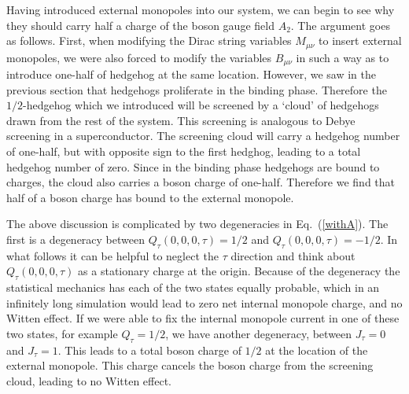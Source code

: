 \documentclass[prb,twocolumn]{revtex4-1}
\begin{document}
Having introduced external monopoles into our system, we can begin to see why they should carry half a charge of the boson gauge field $A_2$. 
The argument goes as follows. First, when modifying the Dirac string variables $M_{\mu\nu}$ to insert external monopoles, we were also forced to modify the variables $B_{\mu\nu}$ in such a way as to introduce one-half of hedgehog at the same location. However, we saw in the previous section that hedgehogs proliferate in the binding phase. Therefore the $1/2$-hedgehog which we introduced will be screened by a `cloud' of hedgehogs drawn from the rest of the system. This screening is analogous to Debye screening in a superconductor. The screening cloud will carry a hedgehog number of one-half, but with opposite sign to the first hedghog, leading to a total hedgehog number of zero. Since in the binding phase hedgehogs are bound to charges, the cloud also carries a boson charge of one-half. Therefore we find that half of a boson charge has bound to the external monopole.


The above discussion is complicated by two degeneracies in Eq.~(\ref{withA}). The first is a degeneracy between $Q_\tau(0,0,0,\tau)=1/2$ and $Q_\tau(0,0,0,\tau)=-1/2$. In what follows it can be helpful to neglect the $\tau$ direction and think about $Q_\tau(0,0,0,\tau)$ as a stationary charge at the origin. Because of the degeneracy the statistical mechanics has each of the two states equally probable, which in an infinitely long simulation would lead to zero net internal monopole charge, and no Witten effect.
If we were able to fix the internal monopole current in one of these two states, for example $Q_\tau=1/2$, we have another degeneracy, between $J_\tau=0$ and $J_\tau=1$. This leads to a total boson charge of $1/2$ at the location of the external monopole. This charge cancels the boson charge from the screening cloud, leading to no Witten effect. 
\end{document}
